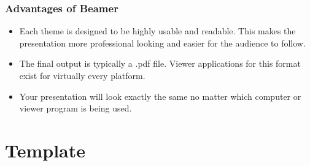 \documentclass[aspectratio=169,utf8]{beamer}
\begin{document}
\begin{frame}
  \frametitle{Advantages of Beamer}

  \begin{itemize}
    \setlength{\itemsep}{8pt}
    \item Each theme is designed to be highly usable and readable. This makes the presentation more professional looking and easier for the audience to follow.
    \item The final output is typically a \alert{.pdf} file. Viewer applications for this format exist for virtually every platform.
    \item \alert{Your presentation will look exactly the same no matter which computer or viewer program is being used.}
  \end{itemize}
  
\end{frame}

\section{Template}
\end{document}
